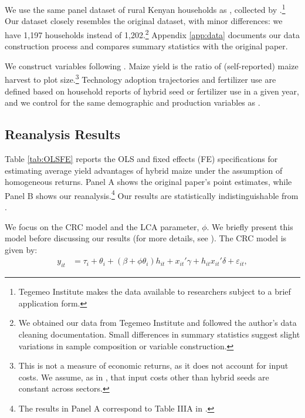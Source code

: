 \documentclass[12pt]{article}
\theoremstyle{plain}
\theoremstyle{definition}
\begin{document}
We use the same panel dataset of rural Kenyan households as \citet{S2011}, collected by \citet{tegemeo2009}.\footnote{Tegemeo Institute makes the data available to researchers subject to a brief application form.} 
Our dataset closely resembles the original dataset, with minor differences:
we have 1,197 households instead of 1,202.\footnote{We obtained our data from Tegemeo Institute and followed the author's data cleaning documentation. Small differences in summary statistics suggest slight variations in sample composition or variable construction.}
Appendix \ref{app:data} documents our data construction process and compares summary statistics with the original paper. 

We construct variables following \citet{S2011}. 
Maize yield is the ratio of (self-reported) maize harvest to plot size.\footnote{This is not a measure of economic returns, as it does not account for input costs. We assume, as in \citet{S2011}, that input costs other than hybrid seeds are constant across sectors.} 
Technology adoption trajectories and fertilizer use are defined based on household reports of  hybrid seed or fertilizer use in a given year, and we control for the same demographic and production variables as \citet{S2011}.

\subsection{Reanalysis Results}

Table \ref{tab:OLSFE} reports the OLS and fixed effects (FE) specifications for estimating average yield advantages of hybrid maize under the assumption of homogeneous returns. Panel A shows the original paper's point estimates, while Panel B shows our reanalysis.\footnote{The results in Panel A correspond to Table IIIA in \citet{S2011}.} Our results are statistically indistinguishable from \citet{S2011}.

We focus on the CRC model and the LCA parameter, $\phi$. 
We briefly present this model before discussing our results (for more details, see \citealp{S2011}). 
The CRC model is given by:
\begin{align}
    y_{it}&=\tau_{i}+\theta_{i}+(\beta+\phi\theta_{i})h_{it}+x_{it}'\gamma+h_{it}x_{it}'\delta+\varepsilon_{it},\label{eq:CRC_model}
\end{align}
\end{document}
